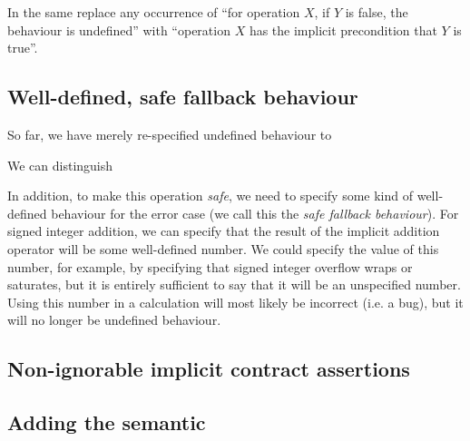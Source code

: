 In the same  replace any occurrence of ``for operation $X$, if $Y$ is false, the behaviour is undefined'' with ``operation $X$ has the implicit precondition that $Y$ is true''.

\subsection{Well-defined, safe fallback behaviour}

So far, we have merely re-specified undefined behaviour to 

We can distinguish

In addition, to make this operation \emph{safe}, we need to specify some kind of well-defined behaviour for the error case (we call this the \emph{safe fallback behaviour}). For signed integer addition, we can specify that the result of the implicit addition operator will be some well-defined number. We could specify the value of this number, for example, by specifying that signed integer overflow wraps or saturates, but it is entirely sufficient to say that it will be an unspecified number. Using this number in a calculation will most likely be incorrect (i.e. a bug), but it will no longer be undefined behaviour.


\subsection{Non-ignorable implicit contract assertions}

\subsection{Adding the  semantic}

